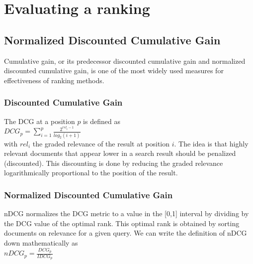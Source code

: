 \chapter{Evaluating a ranking}
\section{Normalized Discounted Cumulative Gain}
Cumulative gain, or its predecessor discounted cumulative gain and normalized discounted cumulative gain, is one of the most widely used measures for effectiveness of ranking methods.
\subsection{Discounted Cumulative Gain}
The \ac{DCG}\cite{Burges2005} at a position $p$ is defined as\\
$DCG_p = \sum\nolimits_{i=1}^p \frac{2^{rel_i-1}}{log_2(i+1)}$\\
with $rel_i$ the graded relevance of the result at position $i$. The idea is that highly relevant documents that appear lower in a search result should be penalized (discounted). This discounting is done by reducing the graded relevance  logarithmically proportional to the position of the result.
\subsection{Normalized Discounted Cumulative Gain}
\ac{nDCG} normalizes the \ac{DCG} metric to a value in the [0,1] interval by dividing by the \ac{DCG} value of the optimal rank. This optimal rank is obtained by sorting documents on relevance for a given query. We can write the definition of \ac{nDCG} down mathematically as\\
$nDCG_p = \frac{DCG_p}{IDCG_p}$
